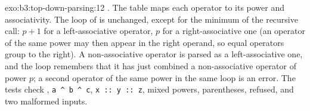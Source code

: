 \begin{solution}{exo:b3:top-down-parsing:12}
. The table maps each operator to its power and associativity. The loop of  is unchanged, except for the minimum of the recursive call: $p + 1$ for a left-associative operator, $p$ for a right-associative one (an operator of the same power may then appear in the right operand, so equal operators group to the right). A non-associative operator is parsed as a left-associative one, and the loop remembers that it has just combined a non-associative operator of power $p$; a second operator of the same power in the same loop is an error. The tests check , \texttt{a \textasciicircum{} b \textasciicircum{} c}, \texttt{x ::\ y ::\ z}, mixed powers, parentheses,  refused, and two malformed inputs.
\end{solution}

